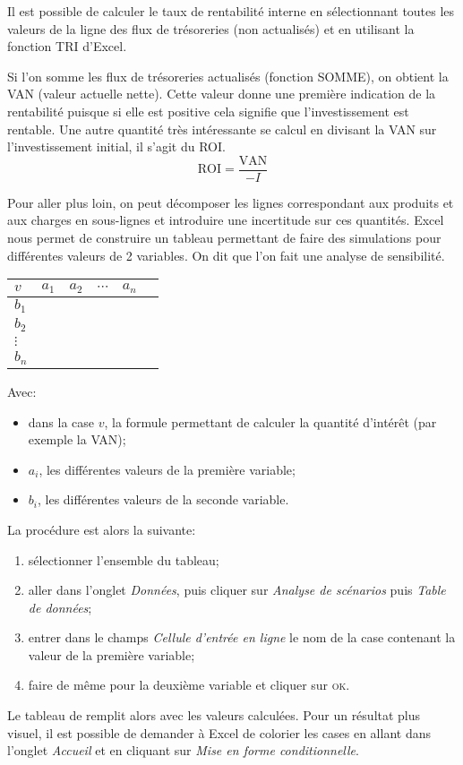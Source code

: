 Il est possible de calculer le taux de rentabilité interne en 
sélectionnant toutes les valeurs de la ligne des flux de trésoreries 
(non actualisés) et en utilisant la fonction \textsc{TRI} d'Excel.

Si l'on somme les flux de trésoreries actualisés (fonction \textsc{SOMME}), 
on obtient la VAN (valeur actuelle nette). 
Cette valeur donne une première indication de la rentabilité puisque si elle 
est positive cela signifie que l'investissement est rentable.
Une autre quantité très intéressante se calcul en divisant la VAN 
sur l'investissement initial, il s'agit du ROI.
\[
\text{ROI} = \frac{\text{VAN}}{-I}
\]

Pour aller plus loin, on peut décomposer les lignes correspondant aux produits et 
aux charges en sous-lignes et introduire une incertitude sur ces quantités.
Excel nous permet de construire un tableau permettant de faire des simulations 
pour différentes valeurs de 2 variables.
On dit que l'on fait une analyse de sensibilité.

\begin{center}
\begingroup
\scriptsize
\begin{tabular}{l|ccccc}
  $v$      & $a_1$   & $a_2$  & $\cdots$ & $a_n$ \\
  \hline
  $b_1$    &         &        &          & \\
  $b_2$    &         &        &          &  \\
  $\vdots$ &         &        &          &  \\
  $b_n$    &         &        &          &
\end{tabular}
\endgroup
\end{center}

Avec:
\begin{itemize}
  \item dans la case $v$, la formule permettant de calculer la quantité d'intérêt (par exemple la VAN);
  \item $a_i$, les différentes valeurs de la première variable;
  \item $b_i$, les différentes valeurs de la seconde variable.
\end{itemize}

La procédure est alors la suivante:
\begin{enumerate}
  \item sélectionner l'ensemble du tableau;
  \item aller dans l'onglet \textit{Données}, puis cliquer sur \textit{Analyse de scénarios}
        puis \textit{Table de données};
  \item entrer dans le champs \textit{Cellule d'entrée en ligne} le nom de la case contenant 
        la valeur de la première variable;
  \item faire de même pour la deuxième variable et cliquer sur \textsc{ok}.
\end{enumerate}
Le tableau de remplit alors avec les valeurs calculées. 
Pour un résultat plus visuel, il est possible de demander à Excel de colorier les 
cases en allant dans l'onglet \textit{Accueil} et en cliquant sur \textit{Mise en forme conditionnelle}.